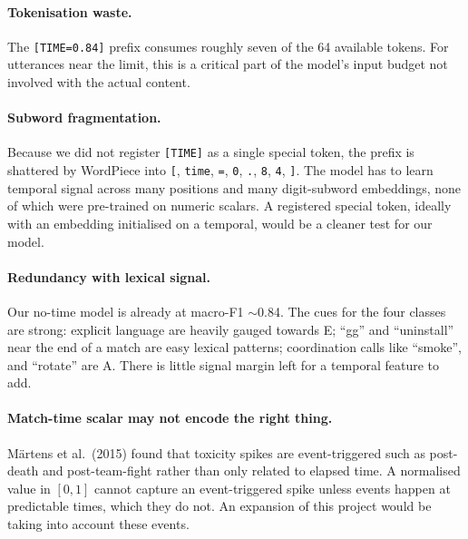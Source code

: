 \documentclass[a4paper,10.5pt,twoside]{article}
\begin{document}
\paragraph{Tokenisation waste.} The \texttt{[TIME=0.84]} prefix consumes roughly seven of the 64 available tokens. For utterances near the limit, this is a critical part of the model's input budget not involved with the actual content.

\paragraph{Subword fragmentation.} Because we did not register \texttt{[TIME]} as a single special token, the prefix is shattered by WordPiece into \texttt{[}, \texttt{time}, \texttt{=}, \texttt{0}, \texttt{.}, \texttt{8}, \texttt{4}, \texttt{]}. The model has to learn temporal signal across many positions and many digit-subword embeddings, none of which were pre-trained on numeric scalars. A registered special token, ideally with an embedding initialised on a temporal, would be a cleaner test for our model.

\paragraph{Redundancy with lexical signal.} Our no-time model is already at macro-F1 $\sim$0.84. The cues for the four classes are strong: explicit language are heavily gauged towards E; ``gg'' and ``uninstall'' near the end of a match are easy lexical patterns; coordination calls like ``smoke'', and ``rotate'' are A. There is little signal margin left for a temporal feature to add.

\paragraph{Match-time scalar may not encode the right thing.} M\"artens et al.\ (2015) found that toxicity spikes are event-triggered such as post-death and post-team-fight rather than only related to elapsed time. A normalised value in $[0, 1]$ cannot capture an event-triggered spike unless events happen at predictable times, which they do not. An expansion of this project would be taking into account these events.
\end{document}
